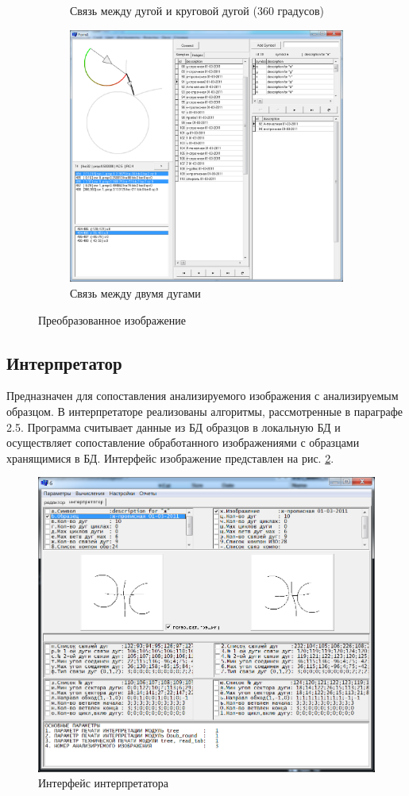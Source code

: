 \begin{figure}[h]
\begin{subfigure}{.5\textwidth}
		\caption{Связь между дугой и круговой дугой (360 градусов)}
	\end{subfigure}
	\begin{subfigure}{1\textwidth}
			\centering
			\includegraphics[width=.45\linewidth]{images/an_preview_3}
			\caption{Связь между двумя дугами}
	\end{subfigure}
	\caption{Преобразованное изображение}
	\label{an:preview}
\end{figure}


\subsection{Интерпретатор}
Предназначен для сопоставления анализируемого изображения с анализируемым образцом. В интерпретаторе реализованы алгоритмы, рассмотренные в параграфе 2.5.
Программа считывает данные из БД образцов в локальную БД и осуществляет сопоставление обработанного изображениями с образцами хранящимися в БД. Интерфейс изображение представлен на рис. \ref{an:analyze}.

\begin{figure}[h]
	\centering
	\includegraphics[scale=0.25]{images/an_convertor_analyze}
	\caption{Интерфейс интерпретатора}
	\label{an:analyze}
\end{figure}

